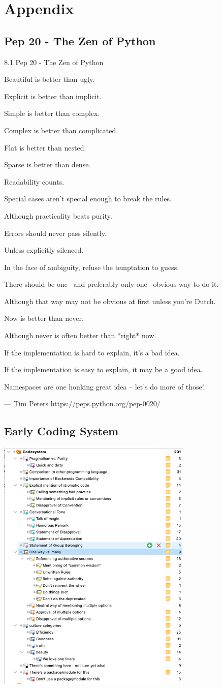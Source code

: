 \section{Appendix}

\subsection{Pep 20 - The Zen of Python}
\label{appendix:A1}
8.1 Pep 20 - The Zen of Python

Beautiful is better than ugly.

Explicit is better than implicit.

Simple is better than complex.

Complex is better than complicated.

Flat is better than nested.

Sparse is better than dense.

Readability counts.

Special cases aren't special enough to break the rules.

Although practicality beats purity.

Errors should never pass silently.

Unless explicitly silenced.

In the face of ambiguity, refuse the temptation to guess.

There should be one-- and preferably only one --obvious way to do it.

Although that way may not be obvious at first unless you're Dutch.

Now is better than never.

Although never is often better than *right* now.

If the implementation is hard to explain, it's a bad idea.

If the implementation is easy to explain, it may be a good idea.

Namespaces are one honking great idea -- let's do more of those!

--- Tim Peters https://peps.python.org/pep-0020/

\subsection{Early Coding System}
\label{appendix:A2}
\includegraphics[width=0.7\textwidth]{early_code_system.png}
